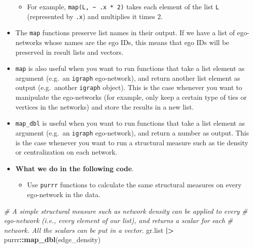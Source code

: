 \documentclass[
]{book}
\newenvironment{Shaded}{\begin{snugshade}}{\end{snugshade}}
\newcommand{\CommentTok}[1]{\textcolor[rgb]{0.56,0.35,0.01}{\textit{#1}}}
\newcommand{\FunctionTok}[1]{\textcolor[rgb]{0.13,0.29,0.53}{\textbf{#1}}}
\newcommand{\NormalTok}[1]{#1}
\newcommand{\SpecialCharTok}[1]{\textcolor[rgb]{0.81,0.36,0.00}{\textbf{#1}}}
\providecommand{\tightlist}{%
  \setlength{\itemsep}{0pt}\setlength{\parskip}{0pt}}
\begin{document}
\begin{itemize}
  \begin{itemize}
  \tightlist
  \item
    For example, \texttt{map(L,\ \textasciitilde{}\ .x\ *\ 2)} takes each element of the list \texttt{L} (represented by \texttt{.x}) and multiplies it times 2.
  \end{itemize}
\item
  The \texttt{map} functions preserve list names in their output. If we have a list of ego-networks whose names are the ego IDs, this means that ego IDs will be preserved in result lists and vectors.
\item
  \texttt{map} is also useful when you want to run functions that take a list element as argument (e.g.~an \texttt{igraph} ego-network), and return another list element as output (e.g.~another \texttt{igraph} object). This is the case whenever you want to manipulate the ego-networks (for example, only keep a certain type of ties or vertices in the networks) and store the results in a new list.
\item
  \texttt{map\_dbl} is useful when you want to run functions that take a list element as argument (e.g.~an \texttt{igraph} ego-network), and return a number as output. This is the case whenever you want to run a structural measure such as tie density or centralization on each network.
\item
  \textbf{What we do in the following code}.

  \begin{itemize}
  \tightlist
  \item
    Use \texttt{purrr} functions to calculate the same structural measures on every ego-network in the data.
  \end{itemize}
\end{itemize}

\begin{Shaded}
\begin{Highlighting}[]
\CommentTok{\# A simple structural measure such as network density can be applied to every}
\CommentTok{\# ego{-}network (i.e., every element of our list), and returns a scalar for each}
\CommentTok{\# network. All the scalars can be put in a vector.}
\NormalTok{gr.list }\SpecialCharTok{|\textgreater{}}
\NormalTok{  purrr}\SpecialCharTok{::}\FunctionTok{map\_dbl}\NormalTok{(edge\_density) }
\end{Highlighting}
\end{Shaded}
\end{document}
